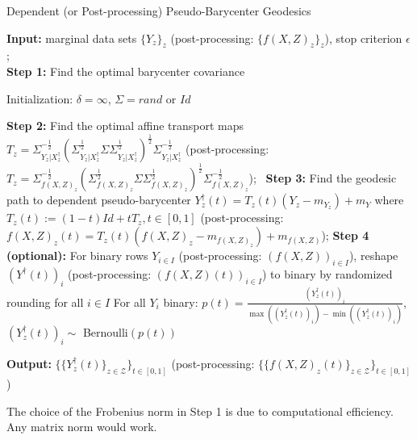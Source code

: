 \documentclass[twoside,11pt]{article}
\begin{document}
\begin{algorithm}
\SetAlgoLined
\caption{Dependent (or Post-processing) Pseudo-Barycenter Geodesics}
\label{a:dependent}

{\bf Input:} marginal data sets $\{Y_z\}_z$ (post-processing: $\{f(X,Z)_z\}_z$), stop criterion $\epsilon$; \\

{\bf Step 1:} Find the optimal barycenter covariance\;

Initialization: $\delta = \infty$, $\Sigma = rand$ or $Id$

 
{\bf Step 2:} Find the optimal affine transport maps\;
$T_z = \Sigma_{Y_z|X^{\dag}_z}^{-\frac{1}{2}} (\Sigma_{Y_z|X^{\dag}_z}^{\frac{1}{2}} \Sigma \Sigma_{Y_z|X^{\dag}_z}^{\frac{1}{2}})^{\frac{1}{2}} \Sigma_{Y_z|X^{\dag}_z}^{-\frac{1}{2}}$ \hfill \tcp{\eqref{eq:dependent pseudo-barycenter affine map}}
(post-processing: $T_z = \Sigma_{f(X,Z)_z}^{-\frac{1}{2}} (\Sigma_{f(X,Z)_z}^{\frac{1}{2}} \Sigma \Sigma_{f(X,Z)_z}^{\frac{1}{2}})^{\frac{1}{2}} \Sigma_{f(X,Z)_z}^{-\frac{1}{2}}$); \hfill \tcp{\eqref{eq:post-processing maps}}\
{\bf Step 3:} Find the geodesic path to dependent pseudo-barycenter\;
$Y^{\dag}_z(t) = T_z(t) (Y_z - m_{Y_z}) + m_Y$ \hfill \tcp{\eqref{eq:dependent pseudo-barycenter }}
where $T_z(t) := (1-t)Id + tT_z, t \in [0,1]$ \hfill \tcp{\eqref{eq:mccann interpolation}}
(post-processing: $f(X,Z)_z(t) = T_z(t) (f(X,Z)_z - m_{f(X,Z)_z}) + m_{f(X,Z)}$); \hfill \tcp{\eqref{eq:post-processing pseudo-barycenter}}
{\bf Step 4 (optional):} For binary rows $Y_{i \in I}$ (post-processing: $(f(X,Z))_{i \in I}$), reshape $(Y^{\dag}(t))_i$ (post-processing: $(f(X,Z)(t))_{i \in I}$) to binary by randomized rounding for all $i \in I$\;
For all $Y_{i}$ binary: $p(t) = \frac{(Y^{\dag}_z(t))_i}{\max((Y^{\dag}_z(t))_i) - \min((Y^{\dag}_z(t))_i)}$, $(Y^{\dag}_z(t))_i \sim$ Bernoulli$(p(t))$\;

{\bf Output:} $\{\{Y^{\dag}_z(t)\}_{z \in \mathcal{Z}}\}_{t \in [0,1]}$ (post-processing: $\{\{f(X,Z)_z(t)\}_{z \in \mathcal{Z}}\}_{t \in [0,1]}$)

\end{algorithm}
The choice of the Frobenius norm  in Step 1 is due to computational efficiency. Any matrix norm would work.
\end{document}
